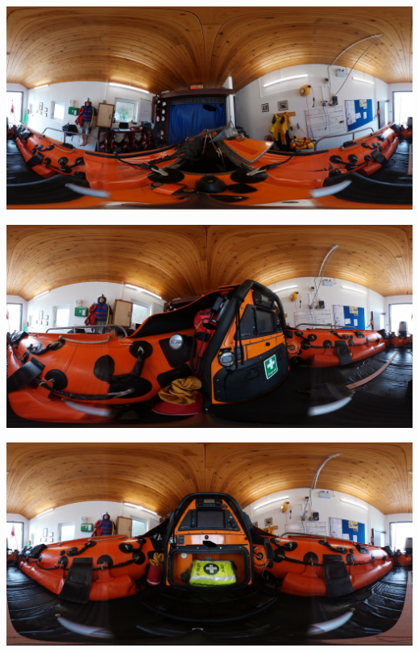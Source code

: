 \documentclass[ %
                    author={Elis Jones},
                supervisor={Dr. Kirsten Cater},
                    degree={BSc},
                     title={The Effect of Presentation Medium on Spatial Cognition},
                  subtitle={in the Virtual Environment},
                      year={2018} ]{dissertation}
\begin{document}
\begin{minipage}{\textwidth}
\begin{center}
    \centering
    \begin{minipage}{0.3\textwidth}
        \centering
        \includegraphics[width=1\textwidth]{images/360-items/anchor.JPG}
    \end{minipage}\hfill
    \begin{minipage}{0.3\textwidth}
        \centering
        \includegraphics[width=1\textwidth]{images/360-items/compass.JPG}
    \end{minipage}\hfill
    \begin{minipage}{0.3\textwidth}
        \centering
        \includegraphics[width=1\textwidth]{images/360-items/firstaid.JPG}

\end{minipage}
\end{center}
\end{minipage}
\end{document}
